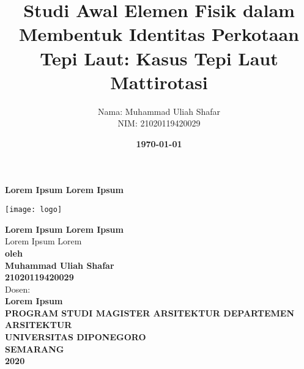 \documentclass[11pt]{simart} %
\title{Studi Awal Elemen Fisik dalam Membentuk Identitas Perkotaan Tepi Laut: Kasus Tepi Laut Mattirotasi}
\date{\textbf{\today}}
\author{
\begin{tabular}{@{}ll@{}}
	Nama & : Muhammad Uliah Shafar\\
	NIM & : 21020119420029\\
\end{tabular}
}
\begin{document}
\thispagestyle{empty}
\begin{center}
	\begin{huge}
		\bf{Lorem Ipsum Lorem Ipsum}
	\end{huge}

	\vspace{20pt}
	\texttt{[image: logo]} \\

	\vspace*{35pt}

	\begin{large}
		\textbf{Lorem Ipsum Lorem Ipsum} \\
		Lorem Ipsum Lorem\\

		\vspace{20pt}
		\textbf{oleh\\
			\vspace{20pt}
			Muhammad Uliah Shafar\\21020119420029}\\

		\vspace{20pt}
		Dosen: \\
		\textbf{Lorem Ipsum}\\



		\vspace{60pt}
		\textbf{PROGRAM STUDI MAGISTER ARSITEKTUR DEPARTEMEN ARSITEKTUR\\
			UNIVERSITAS DIPONEGORO\\
			SEMARANG\\
			2020
		}
	\end{large}
\end{center}
\clearpage

\maketitle %

\end{document}
